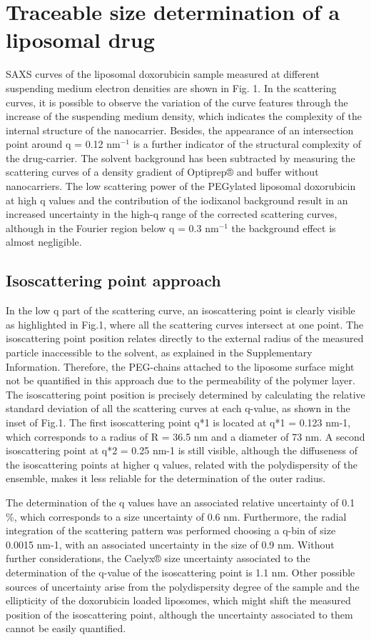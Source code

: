 \section{Traceable size determination of a liposomal drug}
SAXS curves of the liposomal doxorubicin sample measured at different suspending medium electron densities are shown in Fig. 1. In the scattering curves, it is possible to observe the variation of the curve features through the increase of the suspending medium density, which indicates the complexity of the internal structure of the nanocarrier. Besides, the appearance of an intersection point around q = 0.12 nm$^{-1}$ is a further indicator of the structural complexity of the drug-carrier.
The solvent background has been subtracted by measuring the scattering curves of a density gradient of Optiprep® and buffer without nanocarriers. The low scattering power of the PEGylated liposomal doxorubicin at high q values and the contribution of the iodixanol background  result in an increased uncertainty in the high-q range of the corrected scattering curves, although in the Fourier region below q = 0.3 nm$^{-1}$ the background effect is almost negligible.

\subsection{Isoscattering point approach}
In the low q part of the scattering curve, an isoscattering point is clearly visible as highlighted in Fig.1, where all the scattering curves intersect at one point. The isoscattering point position relates directly to the external radius of the measured particle inaccessible to the solvent, as explained in the Supplementary Information. Therefore, the PEG-chains attached to the liposome surface might not be quantified in this approach due to the permeability of the polymer layer. The isoscattering point position is precisely determined by calculating the relative standard deviation of all the scattering curves at each q-value, as shown in the inset of Fig.1. The first isoscattering point q*1 is located at q*1 = 0.123 nm-1, which corresponds to a radius of R = 36.5 nm and a diameter of 73 nm. A second isoscattering point at q*2 = 0.25 nm-1 is still visible, although the diffuseness of the isoscattering points at higher q values, related with the polydispersity of the ensemble, makes it less reliable for the determination of the outer radius.

The determination of the q values have an associated relative uncertainty of 0.1 $\%$, which corresponds to a size uncertainty of 0.6 nm. Furthermore, the radial integration of the scattering pattern was performed choosing a q-bin of size 0.0015 nm-1, with an associated uncertainty in the size of 0.9 nm. Without further considerations, the Caelyx® size uncertainty associated to the determination of the q-value of the isoscattering point is 1.1 nm. Other possible sources of uncertainty arise from the polydispersity degree of the sample and the ellipticity of the doxorubicin loaded liposomes, which might shift the measured position of the isoscattering point, although the uncertainty associated to them cannot be easily quantified. 

